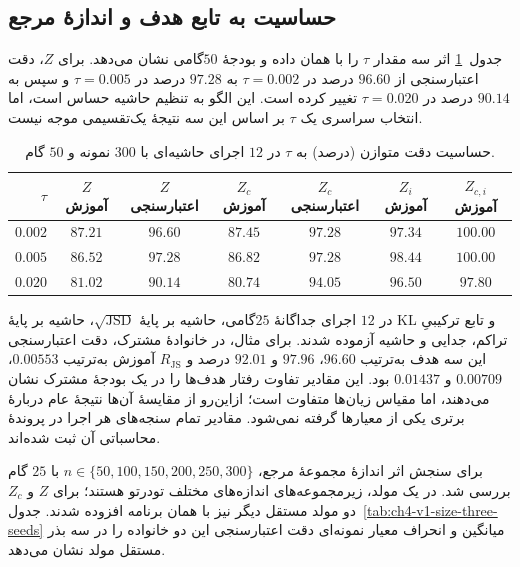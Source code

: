\subsection{حساسیت به تابع هدف و اندازهٔ مرجع}
\label{subsec:ch4-v1-size-study}

جدول~\ref{tab:ch4-v1-tau} اثر سه مقدار $\tau$ را با همان داده و بودجهٔ $50$گامی نشان می‌دهد. برای $Z$، دقت اعتبارسنجی از $96.60$ درصد در $\tau=0.002$ به $97.28$ درصد در $\tau=0.005$ و سپس به $90.14$ درصد در $\tau=0.020$ تغییر کرده است. این الگو به تنظیم حاشیه حساس است، اما انتخاب سراسری یک $\tau$ بر اساس این سه نتیجهٔ یک‌تقسیمی موجه نیست.

\begin{table}[htbp]
\centering\small
\caption{حساسیت دقت متوازن (درصد) به $\tau$ در $12$ اجرای حاشیه‌ای با $300$ نمونه و $50$ گام.}
\label{tab:ch4-v1-tau}
\begin{tabular}{rcccccc}\hline
$\tau$ & $Z$ آموزش & $Z$ اعتبارسنجی & $Z_c$ آموزش & $Z_c$ اعتبارسنجی & $Z_i$ آموزش & $Z_{c,i}$ آموزش\\\hline
$0.002$ & $87.21$ & $96.60$ & $87.45$ & $97.28$ & $97.34$ & $100.00$\\
$0.005$ & $86.52$ & $97.28$ & $86.82$ & $97.28$ & $98.44$ & $100.00$\\
$0.020$ & $81.02$ & $90.14$ & $80.74$ & $94.05$ & $96.50$ & $97.80$\\
\hline
\end{tabular}
\end{table}

در $12$ اجرای جداگانهٔ $25$گامی، حاشیه بر پایهٔ $\sqrt{\operatorname{JSD}}$، حاشیه بر پایهٔ KL و تابع ترکیبیِ تراکم، جدایی و حاشیه آزموده شدند. برای مثال، در خانوادهٔ مشترک، دقت اعتبارسنجی این سه هدف به‌ترتیب $96.60$، $97.96$ و $92.01$ درصد و $R_{\mathrm{JS}}$ آموزش به‌ترتیب $0.00553$، $0.00709$ و $0.01437$ بود. این مقادیر تفاوت رفتار هدف‌ها را در یک بودجهٔ مشترک نشان می‌دهند، اما مقیاس زیان‌ها متفاوت است؛ ازاین‌رو از مقایسهٔ آن‌ها نتیجهٔ عام دربارهٔ برتری یکی از معیارها گرفته نمی‌شود. مقادیر تمام سنجه‌های هر اجرا در پروندهٔ محاسباتی آن ثبت شده‌اند.

برای سنجش اثر اندازهٔ مجموعهٔ مرجع، $n\in\{50,100,150,200,250,300\}$ با $25$ گام بررسی شد. در یک مولد، زیرمجموعه‌های اندازه‌های مختلف تو‌در‌تو هستند؛ برای $Z$ و $Z_c$ دو مولد مستقل دیگر نیز با همان برنامه افزوده شدند. جدول~\ref{tab:ch4-v1-size-three-seeds} میانگین و انحراف معیار نمونه‌ای دقت اعتبارسنجی این دو خانواده را در سه بذر مستقل مولد نشان می‌دهد.

